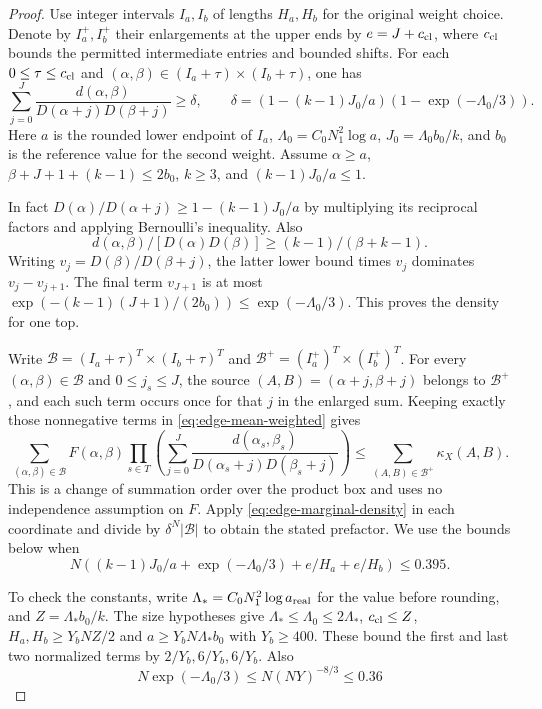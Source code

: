 \begin{proof}
Use integer intervals \(I_a,I_b\) of lengths \(H_a,H_b\)
for the original weight choice. Denote by \(I_a^+,I_b^+\)
their enlargements at the upper ends by \(e=J+c_{\rm cl}\),
where \(c_{\rm cl}\) bounds the permitted intermediate entries
and bounded shifts. For each \(0\le \tau\le c_{\rm cl}\)
and \((\alpha,\beta)\in(I_a+\tau)\times(I_b+\tau)\),
one has
\begin{equation}\label{eq:edge-marginal-density}
 \sum_{j=0}^J\frac{d(\alpha,\beta)}{D(\alpha+j)D(\beta+j)}
    \ge \delta,\qquad
 \delta=(1-(k-1)J_0/a)(1-\exp(-\Lambda_0/3)).
\end{equation}
Here \(a\) is the rounded lower endpoint of \(I_a\),
\(\Lambda_0=C_0N_1^2\log a\),
\(J_0=\Lambda_0 b_0/k\), and \(b_0\) is the reference
value for the second weight. Assume \(\alpha\ge a\),
\(\beta+J+1+(k-1)\le2b_0\), \(k\ge3\), and
\((k-1)J_0/a\le1\).

In fact
\(D(\alpha)/D(\alpha+j)\ge1-(k-1)J_0/a\)
by multiplying its reciprocal factors and applying Bernoulli's
inequality. Also
\[
 d(\alpha,\beta)/[D(\alpha)D(\beta)]\ge (k-1)/(\beta+k-1).
\]
Writing \(v_j=D(\beta)/D(\beta+j)\), the latter lower bound
times \(v_j\) dominates \(v_j-v_{j+1}\).
The final term \(v_{J+1}\) is at most
\(\exp(-(k-1)(J+1)/(2b_0))\le\exp(-\Lambda_0/3)\).
This proves the density for one top.

Write \(\mathcal B=(I_a+\tau)^T\times(I_b+\tau)^T\) and
\(\mathcal B^+=(I_a^+)^T\times(I_b^+)^T\). For every
\((\alpha,\beta)\in\mathcal B\) and \(0\le j_s\le J\), the source
\((A,B)=(\alpha+j,\beta+j)\) belongs to \(\mathcal B^+\), and each
such term occurs once for that \(j\) in the enlarged sum.
Keeping exactly those nonnegative terms in
\eqref{eq:edge-mean-weighted} gives
\[
 \sum_{(\alpha,\beta)\in\mathcal B} F(\alpha,\beta)
 \prod_{s\in T}\left(
 \sum_{j=0}^{J}\frac{d(\alpha_s,\beta_s)}
 {D(\alpha_s+j)D(\beta_s+j)}
 \right)
 \le
 \sum_{(A,B)\in\mathcal B^+}\kappa_X(A,B).
\]
This is a change of summation order over the product box and
uses no independence assumption on \(F\). Apply
\eqref{eq:edge-marginal-density} in each coordinate and divide
by \(\delta^N|\mathcal B|\) to obtain the stated prefactor. We use the
bounds below when
\begin{equation}\label{eq:edge-marginal-loss}
 N\left((k-1)J_0/a+\exp(-\Lambda_0/3)+e/H_a+e/H_b\right)
 \le 0.395 .
\end{equation}

To check the constants, write \(\Lambda_*=C_0N_1^2\log a_{\rm real}\)
for the value before rounding, and
\(Z=\Lambda_* b_0/k\). The size hypotheses give
\(\Lambda_*\le\Lambda_0\le2\Lambda_*\), \(c_{\rm cl}\le Z\),
\(H_a,H_b\ge Y_bNZ/2\) and \(a\ge Y_b N\Lambda_* b_0\)
with \(Y_b\ge400\). These bound the first and last two
normalized terms by \(2/Y_b,6/Y_b,6/Y_b\).
Also
\[
 N\exp(-\Lambda_0/3)\le N(NY)^{-8/3}\le0.36
\]


\end{proof}
